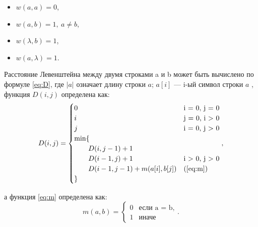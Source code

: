 \documentclass[12pt]{report}
\begin{document}
\begin{itemize}
	\item $w(a,a)=0$,
	\item $w(a,b)=1, \medspace a \neq b$,
	\item $w(\lambda,b)=1$,
	\item $w(a,\lambda)=1$.
\end{itemize}

Расстояние Левенштейна между двумя строками a и b может быть вычислено по формуле \ref{eq:D}, где $|a|$ означает длину строки $a$; $a[i]$ — i-ый символ строки $a$ , функция $D(i, j)$ определена как:
\begin{equation}
\label{eq:D}
D(i, j) = \begin{cases}
0 &\text{i = 0, j = 0}\\
i &\text{j = 0, i > 0}\\
j &\text{i = 0, j > 0}\\
\min \lbrace \\
\qquad D(i, j-1) + 1\\
\qquad D(i-1, j) + 1 &\text{i > 0, j > 0}\\
\qquad D(i-1, j-1) + m(a[i], b[j]) &\text(\ref{eq:m})\\
\rbrace
\end{cases},
\end{equation}

а функция \ref{eq:m} определена как:
\begin{equation}
\label{eq:m}
m(a, b) = \begin{cases}
0 &\text{если a = b,}\\
1 &\text{иначе}
\end{cases}.
\end{equation}
\end{document}

